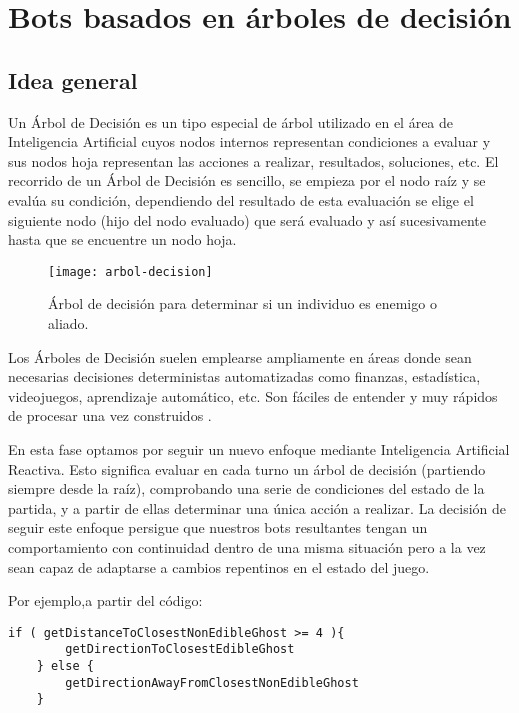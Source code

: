 \chapter{Bots basados en árboles de decisión} \label{cap:bots-arboles}

\section{Idea general}
Un Árbol de Decisión es un tipo especial de árbol utilizado en el área de Inteligencia Artificial cuyos nodos internos representan condiciones a evaluar y sus nodos hoja representan las acciones a realizar, resultados, soluciones, etc. El recorrido de un Árbol de Decisión es sencillo, se empieza por el nodo raíz y se evalúa su condición, dependiendo del resultado de esta evaluación se elige el siguiente nodo (hijo del nodo evaluado) que será evaluado y así sucesivamente hasta que se encuentre un nodo hoja.
\begin{figure}[H]
\centering
\texttt{[image: arbol-decision]}
\caption{Árbol de decisión para determinar si un individuo es enemigo o aliado.}
\end{figure}

Los Árboles de Decisión suelen emplearse ampliamente en áreas donde sean necesarias decisiones deterministas automatizadas como finanzas, estadística, videojuegos, aprendizaje automático, etc. Son fáciles de entender y muy rápidos de procesar una vez construidos \cite{aihorizonDecisiontrees}.

En esta fase optamos por seguir un nuevo enfoque mediante Inteligencia Artificial Reactiva. Esto significa evaluar en cada turno un árbol de decisión (partiendo siempre desde la raíz), comprobando una serie de condiciones del estado de la partida, y a partir de ellas determinar una única acción a realizar. La decisión de seguir este enfoque persigue que nuestros bots resultantes tengan un comportamiento con continuidad dentro de una misma situación pero a la vez sean capaz de adaptarse a cambios repentinos en el estado del juego. 
 
Por ejemplo,a partir del código:
\begin{lstlisting}[caption=Ejemplo de código]
    if ( getDistanceToClosestNonEdibleGhost >= 4 ){
        getDirectionToClosestEdibleGhost
    } else {
        getDirectionAwayFromClosestNonEdibleGhost
    }
\end{lstlisting}

